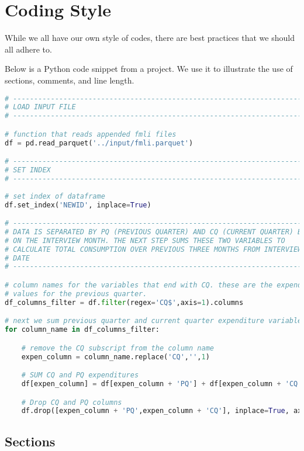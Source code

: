 \section{Coding Style}

While we all have our own style of codes, there are best practices that we should all adhere to.

Below is a Python code snippet from a project. We use it to illustrate the use of sections, comments, and line length.
\begin{lstlisting}[language=python]
# ----------------------------------------------------------------------
# LOAD INPUT FILE
# ------------------------------------------------------------------------

# function that reads appended fmli files
df = pd.read_parquet('../input/fmli.parquet')

# ------------------------------------------------------------------------
# SET INDEX
# ------------------------------------------------------------------------ 
                   
# set index of dataframe
df.set_index('NEWID', inplace=True) 

# ----------------------------------------------------------------------
# DATA IS SEPARATED BY PQ (PREVIOUS QUARTER) AND CQ (CURRENT QUARTER) BASED
# ON THE INTERVIEW MONTH. THE NEXT STEP SUMS THESE TWO VARIABLES TO
# CALCULATE TOTAL CONSUMPTION OVER PREVIOUS THREE MONTHS FROM INTERVIEW
# DATE
# ------------------------------------------------------------------------

# column names for the variables that end with CQ. these are the expenditure
# values for the previous quarter. 
df_columns_filter = df.filter(regex='CQ$',axis=1).columns

# next we sum previous quarter and current quarter expenditure variables
for column_name in df_columns_filter:

    # remove the CQ subscript from the column name
    expen_column = column_name.replace('CQ','',1)

    # SUM CQ and PQ expenditures
    df[expen_column] = df[expen_column + 'PQ'] + df[expen_column + 'CQ']

    # Drop CQ and PQ columns
    df.drop([expen_column + 'PQ',expen_column + 'CQ'], inplace=True, axis=1)
\end{lstlisting}


\subsection{Sections}

